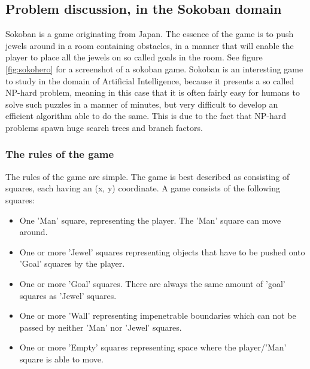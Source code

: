 \subsection{Problem discussion, in the Sokoban domain}
Sokoban is a game originating from Japan. The essence of the game is to push jewels around in a room containing obstacles, in a manner that will enable the player to place all the jewels on so called goals in the room. See figure \ref{fig:sokohero} for a screenshot of a sokoban game.
Sokoban is an interesting game to study in the domain of Artificial Intelligence, because it presents a so called NP-hard problem, meaning in this case that it is often fairly easy for humans to solve such puzzles in a manner of minutes, but very difficult to develop an efficient algorithm able to do the same. This is due to the fact that NP-hard problems spawn huge search trees and branch factors.

\subsubsection{The rules of the game}
The rules of the game are simple. The game is best described as consisting of squares, each having an (x, y) coordinate. A game consists of the following squares:
\begin{itemize}
\item One 'Man' square, representing the player. The 'Man' square can move around.
\item One or more 'Jewel' squares representing objects that have to be pushed onto 'Goal' squares by the player.
\item One or more 'Goal' squares. There are always the same amount of 'goal' squares as 'Jewel' squares.
\item One or more 'Wall' representing impenetrable boundaries which can not be passed by neither 'Man' nor 'Jewel' squares.
\item One or more 'Empty' squares representing space where the player/'Man' square is able to move. 
\end{itemize}

